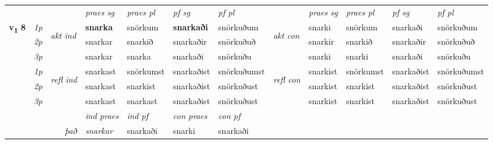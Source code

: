 \begin{longtable}[l]{X>{\footnotesize\itshape}llXXXXlXXXX}
\midrule

 & &   & \textit{praes sg}  & \textit{praes pl}    & \textit{ pf sg} & \textit{pf pl} & & \textit{praes sg}  & \textit{praes pl}    & \textit{pf sg} & \textit{pf pl }  \\ \cmidrule{4-7} \cmidrule{9-12}
 \multirow{2}{*}{{{\textbf{v{\textsubscript{1}}} \Large{\textbf{8}}}}}  & 1p & \multirow{3}{*}{\begin{turn}{90}\textit{akt ind}\end{turn}} & \textbf{snarka} & snörkum & \textbf{snarkaði} & snörkuðum & \multirow{3}{*}{\begin{turn}{90}\textit{akt con}\end{turn}} &snarki & snörkum & snarkaði & snörkuðum\\*
 & 2p &  &  snarkar  & snarkið & snarkaðir & snörkuðuð & & snarkir & snarkið & snarkaðir & snörkuðuð \\*
 & 3p &  & snarkar & snarka & snarkaði & snörkuðu & & snarki & snarki& snarkaði & snörkuðu \\*
\cmidrule{4-7} \cmidrule{9-12}
 & 1p & \multirow{3}{*}{\begin{turn}{90}\textit{refl ind}\end{turn}}  & snarkast & snörkumst & snarkaðist & snörkuðumst & \multirow{3}{*}{\begin{turn}{90}\textit{refl con}\end{turn}}  &snarkist & snörkumst & snarkaðist & snörkuðumst \\*
 & 2p &  & snarkast & snarkist & snarkaðist & snörkuðust & &snarkist & snarkist & snarkaðist & snörkuðust \\*
 & 3p  & & snarkast & snarkast & snarkaðist & snörkuðust & & snarkist & snarkist& snarkaðist & snörkuðust \\*
\cmidrule{4-7} \cmidrule{9-12}

   && &  \textit{ind praes} & \textit{ind pf} & \textit{con praes} & \textit{con pf} \\*
\multicolumn{3}{r}{\textit{það}} & snarkar & snarkaði & snarki & snarkaði \\*


\end{longtable}
